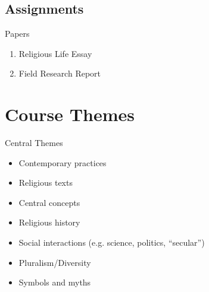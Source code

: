 

\subsection{Assignments}
\begin{frame}{Papers}
	\begin{enumerate}
		\item<1->Religious Life Essay
		\item<2->Field Research Report
	\end{enumerate}
\end{frame}

\section{Course Themes}
\begin{frame}{Central Themes}
	\begin{itemize}
		\item<1->Contemporary practices
		\item<2->Religious texts
		\item<3->Central concepts
		\item<4->Religious history
		\item<5->Social interactions (e.g. science, politics, ``secular'')
		\item<6->Pluralism/Diversity
		\item<7->Symbols and myths
	\end{itemize}
\end{frame}

\timeout